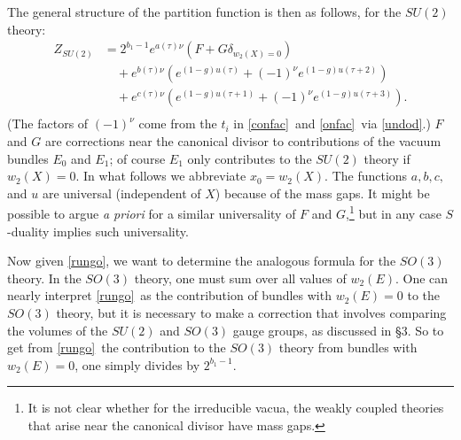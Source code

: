 \documentclass[12pt]{article}
\numberwithin{equation}{section}
\begin{document}
The general structure of the partition function is then as follows,
for the $SU(2)$ theory:
\begin{equation}
  \label{rungo}
  \begin{aligned}
    Z_{SU(2)} &= 2^{b_1-1} e^{a(\tau)\nu}\left(F+G\delta_{w_2(X)=0}\right)\\
    &\quad +e^{b(\tau)\nu}\left(e^{(1-g)u(\tau)}+(-1)^{\nu}
    e^{(1-g)u(\tau+2)}\right)\\
    &\quad +e^{c(\tau)\nu}\left(e^{(1-g)u(\tau+1)}+
    (-1)^{\nu}e^{(1-g)u(\tau+3)}\right).\\
  \end{aligned}
\end{equation}
(The factors of $(-1)^\nu$ come from the $t_i$ in \eqref{confac}\ and
  \eqref{onfac}\
via \eqref{undod}.)  $F$ and $G$ are corrections near the canonical
divisor to contributions of the vacuum bundles $E_0$ and $E_1$; of
course $E_1$ only contributes to the $SU(2)$ theory if $w_2(X)=0$.  In
what follows we abbreviate $x_0=w_2(X)$.
The functions $a,b,c,$ and $u$ are universal (independent of $X$)
because of the mass gaps.  It might be possible to argue {\it a priori}
for a similar
universality of $F$ and $G$,\footnote{It is not clear whether for the
  irreducible vacua, the weakly coupled theories that arise near the
canonical divisor have mass gaps.}
but in any case $S$-duality implies such universality.

Now given \eqref{rungo}, we want to determine the analogous formula
for the $SO(3)$ theory.  In the $SO(3)$ theory, one must sum
over all values of $w_2(E)$.  One can nearly interpret
\eqref{rungo}\ as the contribution of bundles with $w_2(E)=0$ to the $SO(3)$
theory, but it is necessary to make a correction that involves
comparing the volumes of the $SU(2)$ and $SO(3)$ gauge groups,
as discussed in \S3.
So to get from \eqref{rungo}\ the contribution to the $SO(3)$ theory from
bundles with $w_2(E)=0$, one simply divides by $2^{b_1-1}$.
\end{document}
